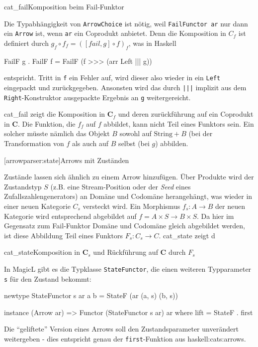 \documentclass[11pt, a4paper, bibgerm]{book}
\newcommand\icode[1]{\lstinline?#1?}
\newcommand\lsection{}
\newcommand\sref{}
\newcommand\abb{}
\newcommand\fig{}
\newcommand\ato{\rightarrow} %
\begin{document}
\fig{cat_fail}{Komposition beim Fail-Funktor}

Die Typabhängigkeit von \icode{ArrowChoice} ist nötig, weil
\icode{FailFunctor ar} nur dann ein \icode{Arrow} ist, wenn \icode{ar}
ein Coprodukt anbietet. Denn die Komposition in $C_{f}$ ist definiert
durch $g_{f} \circ f_{f} = ([fail,g] \circ f)_{f}$, was in Haskell
\begin{code}
FailF g . FailF f = FailF (f >>> (arr Left ||| g))
\end{code} %
entspricht. Tritt in \icode{f} ein Fehler auf, wird dieser also wieder
in ein \icode{Left} eingepackt und zurückgegeben. Ansonsten wird das
durch \icode{|||} implizit aus dem \icode{Right}-Konstruktor ausgepackte
Ergebnis an \icode{g} weitergereicht.

\abb{cat_fail} zeigt die Komposition in $\mathbf{C}_f$ und deren
zurückführung auf ein Coprodukt in $\mathbf{C}$. Die Funktion, die $f_f$
auf $f$ abbildet, kann nicht Teil eines Funktors sein. Ein solcher
müsste nämlich das Objekt $B$ sowohl auf $\mathrm{String}+B$ (bei der
Transformation von $f$ als auch auf $B$ selbst (bei $g$) abbilden.

\lsection[arrowparser:state]{Arrows mit Zuständen}

Zustände lassen sich ähnlich zu einem Arrow hinzufügen. Über Produkte
wird der Zustandstyp $S$ (z.B. eine Stream-Position oder der
\textit{Seed} eines Zufallszahlengenerators) an Domäne und Codomäne
herangehängt, was wieder in einer neuen Kategorie $C_{s}$ versteckt
wird. Ein Morphismus $f_{s} : A \rightarrow B$ der neuen Kategorie wird
entsprechend abgebildet auf $f = A \times S \rightarrow B \times S$. Da
hier im Gegensatz zum Fail-Funktor Domäne und Codomäne gleich abgebildet
werden, ist diese Abbildung Teil eines Funktors $F_s: C_{s}
\ato C$. \abb{cat_state} zeigt d

\fig{cat_state}{Komposition in $\mathbf{C}_s$ und Rückführung auf
  $\mathbf{C}$ durch $F_s$}

In MagicL gibt es die Typklasse \icode{StateFunctor}, die einen weiteren
Typparameter \icode{s} für den Zustand bekommt:

\begin{code}
newtype StateFunctor s ar a b = StateF (ar (a, s) (b, s))

instance (Arrow ar) => Functor (StateFunctor s ar) ar where
    lift = StateF . first
\end{code} %

Die "`geliftete"' Version eines Arrows soll den Zustandsparameter
unverändert weitergeben - dies entspricht genau der
\icode{first}-Funktion aus \sref{haskell:cats:arrows}.
\end{document}
